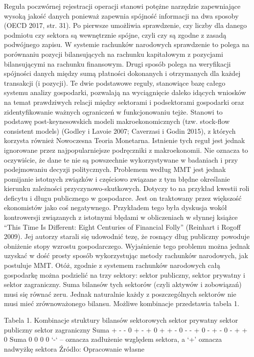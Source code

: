 \documentclass[
]{book}
\begin{document}
Reguła poczwórnej rejestracji operacji stanowi potężne narzędzie zapewniające wysoką jakość danych ponieważ zapewnia spójność informacji na dwa sposoby (OECD 2017, str. 31). Po pierwsze umożliwia sprawdzenie, czy liczby dla danego podmiotu czy sektora są wewnętrznie spójne, czyli czy są zgodne z zasadą podwójnego zapisu. W systemie rachunków narodowych sprawdzenie to polega na porównaniu pozycji bilansujących na rachunku kapitałowym z pozycjami bilansującymi na rachunku finansowym. Drugi sposób polega na weryfikacji spójności danych między sumą płatności dokonanych i otrzymanych dla każdej transakcji (i pozycji).
Te dwie podstawowe reguły, stanowiące bazę całego systemu analizy gospodarki, pozwalają na wyciągnięcie daleko idących wniosków na temat prawdziwych relacji między sektorami i podsektorami gospodarki oraz zidentyfikowanie ważnych ograniczeń w funkcjonowaniu tejże. Stanowi to podstawę post-keynesowskich modeli makroekonomicznych (tzw. stock-flow consistent models) (Godley i Lavoie 2007; Caverzasi i Godin 2015), z których korzysta również Nowoczesna Teoria Monetarna. Istnienie tych reguł jest jednak ignorowane przez najpopularniejsze podręczniki z makroekonomii.
Nie oznacza to oczywiście, że dane te nie są powszechnie wykorzystywane w badaniach i przy podejmowaniu decyzji politycznych. Problemem według MMT jest jednak pomijanie istotnych związków i częściowo związane z tym błędne określanie kierunku zależności przyczynowo-skutkowych.
Dotyczy to na przykład kwestii roli deficytu i długu publicznego w gospodarce. Jest on traktowany przez większość ekonomistów jako coś negatywnego. Przykładem tego była dyskusja wokół kontrowersji związanych z istotnymi błędami w obliczeniach w słynnej książce ``This Time Is Different: Eight Centuries of Financial Folly'' (Reinhart i Rogoff 2009). Jej autorzy starali się udowodnić tezę, że rosnący dług publiczny powoduje obniżenie stopy wzrostu gospodarczego.
Wyjaśnienie tego problemu można jednak uzyskać w dość prosty sposób wykorzystując metody rachunków narodowych, jak postuluje MMT.
Otóż, zgodnie z systemem rachunków narodowych całą gospodarkę można podzielić na trzy sektory: sektor publiczny, sektor prywatny i sektor zagraniczny. Suma bilansów tych sektorów (czyli aktywów i zobowiązań) musi się równać zeru. Jednak naturalnie każdy z poszczególnych sektorów nie musi mieć zrównoważonego bilansu. Możliwe kombinacje przedstawia tabela 1.

Tabela 1. Kombinacje struktury bilansów sektorowych
sektor prywatny sektor publiczny sektor zagraniczny Suma
+ - - 0
+ - + 0
+ + - 0
- - + 0
- + - 0
- + + 0
Suma 0 0 0 0
`-` -- oznacza zadłużenie względem sektora, a `+' oznacza nadwyżkę sektora
Źródło: Opracowanie własne
\end{document}
